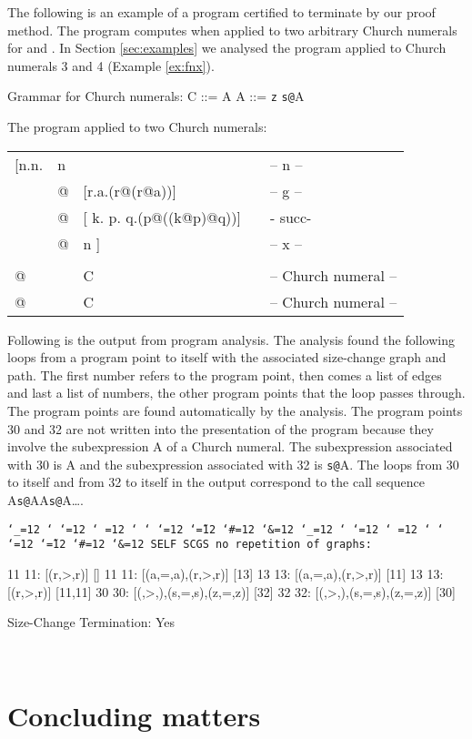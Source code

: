 \documentclass{LMCS}
\makeatletter
\newcommand{\fl}{\noindent}
\newcommand{\hair}{\hspace{2mm}}
\newcommand{\vair}{\relax}
\newcommand{\bt}{\begin{tabular}}
\newcommand{\et}{\end{tabular}}
\newcommand{\bp}{\begin{program}\small}
\newcommand{\ep}{\end{program}}
\newcommand{\programenvironment}{\programmode \def\par{\leavevmode\endgraf}\obeylines\nobreak \programmode}
\newcommand{\programmode}{\tt \catcode`\_=12 \catcode`\?=12 \catcode`\.=12 \catcode`\,=12
	\catcode`\;=12 \catcode`\:=12 \catcode`\@=12 \catcode`\~=12
        \catcode`\#=12 \catcode`\&=12      \obeyspaces\frenchspacing}
\newenvironment{programintext}{\programenvironment}{}
\newenvironment{program}{\setlength{\partopsep}{0mm}\setlength{\topsep}{0mm}
	\begin{trivlist}\item[]
\hspace*{5mm}\begin{minipage}{1.0\textwidth}
\vspace{1mm}
	\begin{programintext}
	}{\end{programintext}
	\vspace{1mm}
	\end{minipage}
	\end{trivlist}
	\noindent}
\theoremstyle{definition}\newtheorem{env}[thm]{Environment}
\makeatother
\begin{document}
\begin{exa}
The following is an example of a  program certified to terminate  by our proof method. The program computes  when applied to two arbitrary Church numerals for  and . In Section \ref{sec:examples} we analysed the program applied to Church numerals 3 and 4 (Example \ref{ex:fnx}).
\medskip

\fl Grammar for Church numerals:\hair\hair 
C ::= A\hair\hair
A ::= {\tt z}   {\tt s}{\tt @}A
\vair

\fl The program applied to two Church numerals:
\vair

{\tt\bt{lllll}
[n.n. & n    &&& -- n --\\
   & @ & [r.a.\fbox{11:}(r@\fbox{13:}(r@a))] && -- 
   g --\\
  & @ & [ k. p. q.(p@((k@p)@q))] && - succ-\\
  & @ & n ]   && -- x --\\\\
   @ & & C  && -- Church numeral --\\
   @ & & C  && -- Church numeral --
   \et}
\bigskip

Following is the output from program analysis. The analysis found
the following loops from a program point to itself with the associated
size-change graph and path. The first number refers to the program point,
then comes a list of edges and last a list of numbers, the other program
points that the loop passes through. The program points are found automatically by the analysis. The program points 30 and 32 are not written into the presentation of the program because they involve the subexpression A of a Church numeral. The subexpression associated with 30 is A and the subexpression associated with 32 is {\tt s@}A. The loops  from 30 to itself and from 32 to itself in the output correspond to the call sequence 
A{\tt s@}AA{\tt s@}A\ldots.

\bp
SELF SCGS no repetition of graphs: 

11  11: [(r,>,r)]                                     []
11  11: [(a,=,a),(r,>,r)]                             [13]
13  13: [(a,=,a),(r,>,r)]                             [11]
13  13: [(r,>,r)]                                     [11,11]
30  30: [(,>,),(s,=,s),(z,=,z)]   [32]
32  32: [(,>,),(s,=,s),(z,=,z)]   [30]

Size-Change Termination: Yes
\ep


\

\end{exa}
\section{Concluding matters}
\end{document}
